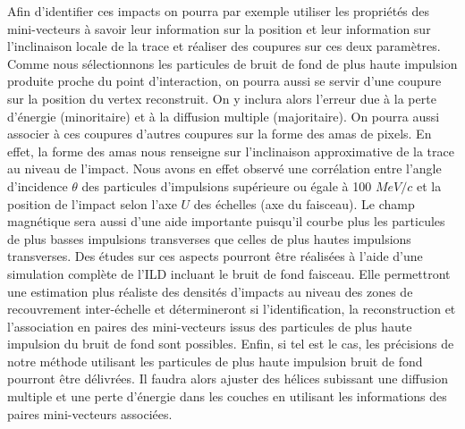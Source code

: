   Afin d'identifier ces impacts on pourra par exemple utiliser les propri\'et\'es des mini-vecteurs \`a savoir leur information sur la position et leur information sur l'inclinaison locale de la trace et r\'ealiser des coupures sur ces deux param\`etres. Comme nous s\'electionnons les particules de bruit de fond de plus haute impulsion produite proche du point d'interaction, on pourra aussi se servir d'une coupure sur la position du vertex reconstruit. On y inclura alors l'erreur due \`a la perte d'\'energie (minoritaire) et \`a la diffusion multiple (majoritaire). On pourra aussi associer \`a ces coupures d'autres coupures sur la forme des amas de pixels. En effet, la forme des amas nous renseigne sur l'inclinaison approximative de la trace au niveau de l'impact. Nous avons en effet observ\'e une corr\'elation entre l'angle d'incidence $\theta$ des particules d'impulsions sup\'erieure ou \'egale \`a 100 $MeV/c$ et la position de l'impact selon l'axe $U$ des \'echelles (axe du faisceau). Le champ magn\'etique sera aussi d'une aide importante puisqu'il courbe plus les particules de plus basses impulsions transverses que celles de plus hautes impulsions transverses. Des \'etudes sur ces aspects pourront \^etre r\'ealis\'ees \`a l'aide d'une simulation compl\`ete de l'ILD incluant le bruit de fond faisceau. Elle permettront une estimation plus r\'ealiste des densit\'es d'impacts au niveau des zones de recouvrement inter-\'echelle et détermineront si l'identification, la reconstruction et l'association en paires des mini-vecteurs issus des particules de plus haute impulsion du bruit de fond sont possibles. Enfin, si tel est le cas, les précisions de notre m\'ethode utilisant les particules de plus haute impulsion bruit de fond pourront \^etre d\'elivr\'ees. Il faudra alors ajuster des h\'elices subissant une diffusion multiple et une perte d'\'energie dans les couches en utilisant les informations des paires mini-vecteurs associ\'ees.
  
